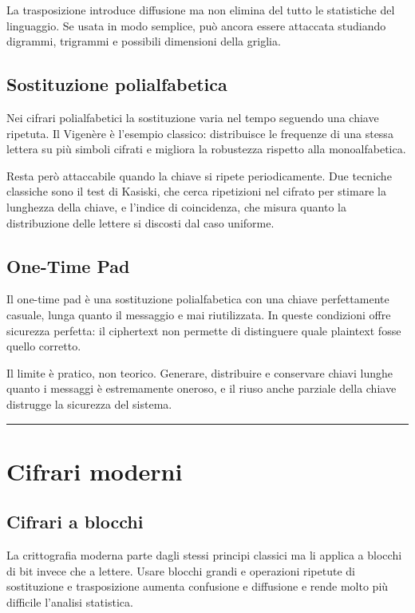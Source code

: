 \documentclass[12pt, a4paper]{report}
\begin{document}
La trasposizione introduce diffusione ma non elimina del tutto le statistiche del linguaggio. Se usata in modo semplice, può ancora essere attaccata studiando digrammi, trigrammi e possibili dimensioni della griglia.

\subsection{Sostituzione polialfabetica}
Nei cifrari polialfabetici la sostituzione varia nel tempo seguendo una chiave ripetuta. Il Vigenère è l'esempio classico: distribuisce le frequenze di una stessa lettera su più simboli cifrati e migliora la robustezza rispetto alla monoalfabetica.

Resta però attaccabile quando la chiave si ripete periodicamente. Due tecniche classiche sono il test di Kasiski, che cerca ripetizioni nel cifrato per stimare la lunghezza della chiave, e l'indice di coincidenza, che misura quanto la distribuzione delle lettere si discosti dal caso uniforme.

\subsection{One-Time Pad}
Il one-time pad è una sostituzione polialfabetica con una chiave perfettamente casuale, lunga quanto il messaggio e mai riutilizzata. In queste condizioni offre sicurezza perfetta: il ciphertext non permette di distinguere quale plaintext fosse quello corretto.

Il limite è pratico, non teorico. Generare, distribuire e conservare chiavi lunghe quanto i messaggi è estremamente oneroso, e il riuso anche parziale della chiave distrugge la sicurezza del sistema.

\noindent\rule{\textwidth}{0.4pt}

\section{Cifrari moderni}

\subsection{Cifrari a blocchi}
La crittografia moderna parte dagli stessi principi classici ma li applica a blocchi di bit invece che a lettere. Usare blocchi grandi e operazioni ripetute di sostituzione e trasposizione aumenta confusione e diffusione e rende molto più difficile l'analisi statistica.
\end{document}
